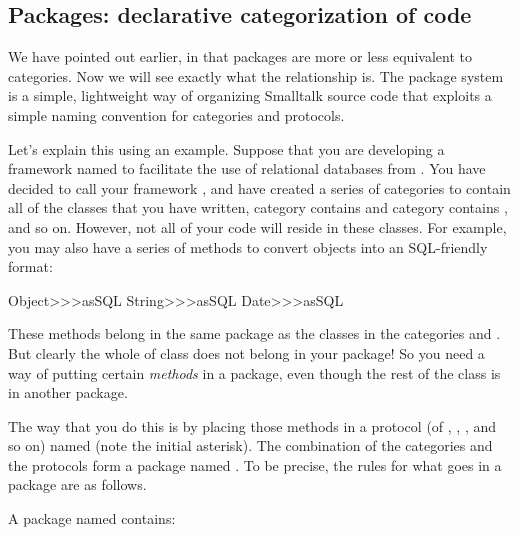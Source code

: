 \documentclass[a4paper,10pt,twoside]{book}
\begin{document}
\subsection{Packages: declarative categorization of \pharo code}

We have pointed out earlier, in  that packages are more or less equivalent to categories. Now we will see exactly what the relationship is.
The package system is a simple, lightweight way of organizing Smalltalk source code that exploits a simple naming convention for categories and protocols.

Let's explain this using an example.
Suppose that you are developing a framework named to facilitate the use of relational databases from \pharo. You have decided to call your framework , and have created a series of categories to contain all of the classes that you have written, \eg
category  contains  and category  contains , and so on. However, not all of your code will reside in these classes. For example, you may also have a series of methods to convert objects into an SQL-friendly format:

\begin{code}{}
Object>>>asSQL
String>>>asSQL
Date>>>asSQL
\end{code}

\noindent
These methods belong in
the same package as the classes in the 
categories  and . 
But clearly the whole of class  does not belong in your package! 
So you need a way of putting certain \emph{methods} in a package, even though the rest of the class is in another package.

The way that you do this is by placing those methods in a protocol (of , , , and so on) named  (note the initial asterisk). The combination of the  categories and the  protocols form a package named .
To be precise, the rules for what goes in a package are as follows.

A package named  contains:
\end{document}
